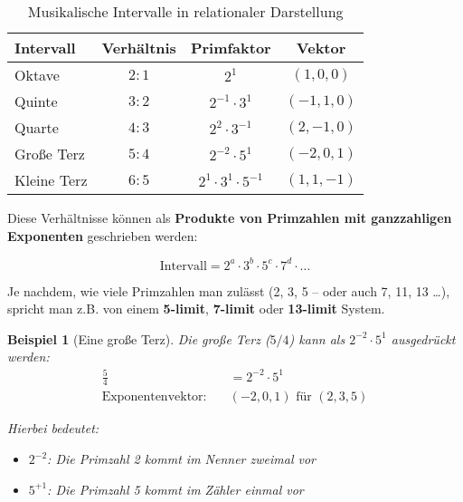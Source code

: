 \documentclass[11pt,a4paper]{article}
\newtheorem{example}{Beispiel}[section]
\begin{document}
	\begin{table}[htbp]
		\centering
		\begin{adjustbox}{width=0.85\textwidth}
			\begin{tabular}{lccc}
				\toprule
				\textbf{Intervall} & \textbf{Verhältnis} & \textbf{Primfaktor} & \textbf{Vektor} \\
				\midrule
				Oktave & $2:1$ & $2^1$ & $(1, 0, 0)$ \\
				Quinte & $3:2$ & $2^{-1} \cdot 3^1$ & $(-1, 1, 0)$ \\
				Quarte & $4:3$ & $2^2 \cdot 3^{-1}$ & $(2, -1, 0)$ \\
				Große Terz & $5:4$ & $2^{-2} \cdot 5^1$ & $(-2, 0, 1)$ \\
				Kleine Terz & $6:5$ & $2^1 \cdot 3^1 \cdot 5^{-1}$ & $(1, 1, -1)$ \\
				\bottomrule
			\end{tabular}
		\end{adjustbox}
		\caption{Musikalische Intervalle in relationaler Darstellung}
		\label{tab:intervalle}
	\end{table}
	
	Diese Verhältnisse können als \textbf{Produkte von Primzahlen mit ganzzahligen Exponenten} geschrieben werden:
	
	\begin{equation}
		\text{Intervall} = 2^a \cdot 3^b \cdot 5^c \cdot 7^d \cdot \ldots
	\end{equation}
	
	Je nachdem, wie viele Primzahlen man zulässt (2, 3, 5 – oder auch 7, 11, 13 \ldots), spricht man z.B. von einem \textbf{5-limit}, \textbf{7-limit} oder \textbf{13-limit} System.
	
	\begin{example}[Eine große Terz]
		Die große Terz ($5/4$) kann als $2^{-2} \cdot 5^1$ ausgedrückt werden:
		\begin{align}
			\frac{5}{4} &= 2^{-2} \cdot 5^1 \\
			\text{Exponentenvektor:} \quad &(-2, 0, 1) \text{ für } (2, 3, 5)
		\end{align}
		
		Hierbei bedeutet:
		\begin{itemize}
			\item $2^{-2}$: Die Primzahl 2 kommt im Nenner zweimal vor
			\item $5^{+1}$: Die Primzahl 5 kommt im Zähler einmal vor
		\end{itemize}
	\end{example}
	
\end{document}
